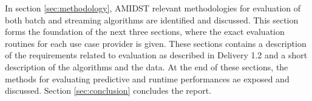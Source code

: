 In section \ref{sec:methodology}, AMIDST relevant methodologies for evaluation of both batch and streaming algorithms are identified and discussed.  This section forms the foundation of the next three sections, where the exact evaluation routines for each use case provider is given. These sections contains a description of the requirements related to evaluation as described in Delivery 1.2 and a short description of the algorithms and the data.  At the end of these sections, the methods for evaluating predictive and runtime performances ae exposed and discussed.  Section \ref{sec:conclusion} concludes the report.


%
%
